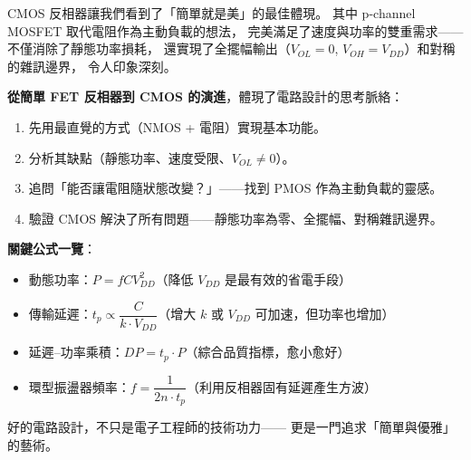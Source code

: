 \documentclass[12pt]{article}
\begin{document}
\begin{keybox}[本章核心思想]
CMOS 反相器讓我們看到了「簡單就是美」的最佳體現。
其中 p-channel MOSFET 取代電阻作為主動負載的想法，
完美滿足了速度與功率的雙重需求——不僅消除了靜態功率損耗，
還實現了全擺幅輸出（$V_{OL}=0$, $V_{OH}=V_{DD}$）和對稱的雜訊邊界，
令人印象深刻。

\medskip
\textbf{從簡單 FET 反相器到 CMOS 的演進}，體現了電路設計的思考脈絡：
\begin{enumerate}[leftmargin=2.2em,itemsep=2pt]
  \item 先用最直覺的方式（NMOS + 電阻）實現基本功能。
  \item 分析其缺點（靜態功率、速度受限、$V_{OL} \neq 0$）。
  \item 追問「能否讓電阻隨狀態改變？」——找到 PMOS 作為主動負載的靈感。
  \item 驗證 CMOS 解決了所有問題——靜態功率為零、全擺幅、對稱雜訊邊界。
\end{enumerate}

\medskip
\textbf{關鍵公式一覽}：
\begin{itemize}[leftmargin=2.2em,itemsep=2pt]
  \item 動態功率：$P = fCV_{DD}^2$（降低 $V_{DD}$ 是最有效的省電手段）
  \item 傳輸延遲：$t_p \propto \dfrac{C}{k \cdot V_{DD}}$（增大 $k$ 或 $V_{DD}$ 可加速，但功率也增加）
  \item 延遲--功率乘積：$DP = t_p \cdot P$（綜合品質指標，愈小愈好）
  \item 環型振盪器頻率：$f = \dfrac{1}{2n \cdot t_p}$（利用反相器固有延遲產生方波）
\end{itemize}
\end{keybox}

好的電路設計，不只是電子工程師的技術功力——
更是一門追求「簡單與優雅」的藝術。
\end{document}
